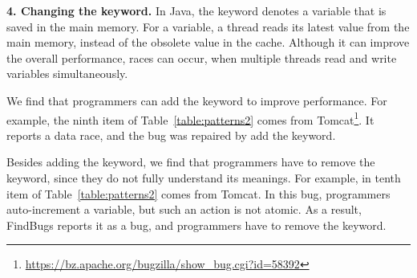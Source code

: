 










\noindent
\textbf{4. Changing the  keyword.} In Java, the  keyword denotes a variable that is saved in the main memory. For a  variable, a thread reads its latest value from the main memory, instead of the obsolete  value in the cache. Although it can improve the overall performance, races can occur, when multiple threads read and write  variables simultaneously.

We find that programmers can add the  keyword to improve performance. For example, the ninth item of Table~\ref{table:patterns2} comes from Tomcat\footnote{\url{https://bz.apache.org/bugzilla/show_bug.cgi?id=58392}}. It reports a data race, and the bug was repaired by add the  keyword.


Besides adding the keyword, we find that programmers have to remove the  keyword, since they do not fully understand its meanings. For example, in tenth item of Table~\ref{table:patterns2} comes from Tomcat. In this bug, programmers auto-increment a  variable, but such an action is not atomic. As a result, FindBugs reports it as a bug, and programmers have to remove the keyword.

